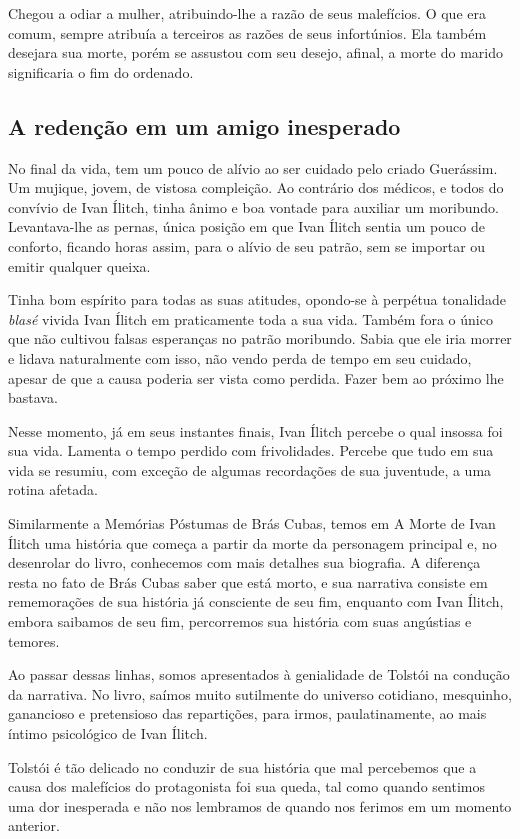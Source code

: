 \documentclass[12pt]{extarticle}
\begin{document}
Chegou a odiar a mulher, atribuindo-lhe a razão de seus malefícios. O
que era comum, sempre atribuía a terceiros as razões de seus
infortúnios. Ela também desejara sua morte, porém se assustou com seu
desejo, afinal, a morte do marido significaria o fim do ordenado.

\subsection{A redenção em um amigo inesperado}

No final da vida, tem um pouco de alívio ao ser cuidado pelo criado
Guerássim. Um mujique, jovem, de vistosa compleição. Ao contrário dos
médicos, e todos do convívio de Ivan Ílitch, tinha ânimo e boa vontade
para auxiliar um moribundo. Levantava-lhe as pernas, única posição em
que Ivan Ílitch sentia um pouco de conforto, ficando horas assim,
para o alívio de seu patrão, sem se importar ou emitir qualquer queixa.

Tinha bom espírito para todas as suas atitudes, opondo-se à perpétua
tonalidade \emph{blasé} vivida Ivan Ílitch em praticamente toda a sua
vida. Também fora o único que não cultivou falsas esperanças no patrão
moribundo. Sabia que ele iria morrer e lidava naturalmente com isso, não
vendo perda de tempo em seu cuidado, apesar de que a causa poderia ser
vista como perdida. Fazer bem ao próximo lhe bastava.

Nesse momento, já em seus instantes finais, Ivan Ílitch percebe o qual
insossa foi sua vida. Lamenta o tempo perdido com
frivolidades. Percebe que tudo em
sua vida se resumiu, com exceção de algumas recordações de sua juventude,
a uma rotina afetada.

Similarmente a Memórias Póstumas de Brás Cubas, temos em A Morte de Ivan
Ílitch uma história que começa a partir da morte da personagem principal
e, no desenrolar do livro, conhecemos com mais detalhes sua biografia. A
diferença resta no fato de Brás Cubas saber que está morto, e sua narrativa
consiste em rememorações de sua história já consciente de seu fim,
enquanto com Ivan Ílitch, embora saibamos de seu fim, percorremos sua
história com suas angústias e temores.

 Ao passar dessas linhas, somos apresentados à genialidade de Tolstói na condução da narrativa. No livro, saímos muito
sutilmente do universo cotidiano, mesquinho, ganancioso e pretensioso
das repartições, para irmos, paulatinamente, ao
mais íntimo psicológico de Ivan Ílitch.

Tolstói é tão delicado no conduzir de sua história que mal percebemos
que a causa dos malefícios do protagonista foi sua queda, tal como
quando sentimos uma dor inesperada e não nos lembramos de quando nos
ferimos em um momento anterior.
\end{document}
